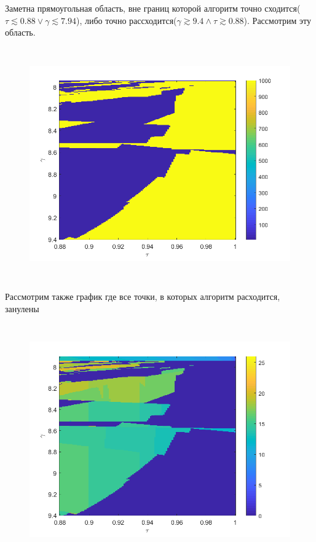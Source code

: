 \documentclass[12pt,a4paper]{scrartcl}
\begin{document}
Заметна прямоугольная область, вне границ которой алгоритм точно сходится($\tau \lesssim 0.88 \vee  \gamma \lesssim 7.94$), либо точно рассходится($\gamma \gtrsim 9.4 \wedge \tau \gtrsim 0.88$). Рассмотрим эту область.

\begin{figure}[H]
    \centering
    \includegraphics[width=14cm, height=10cm]{fig/2.png}
\end{figure}

Рассмотрим также график где все точки, в которых алгоритм расходится, занулены

\begin{figure}[H]
    \centering
    \includegraphics[width=14cm, height=10cm]{fig/3.png}
\end{figure}
\end{document}

